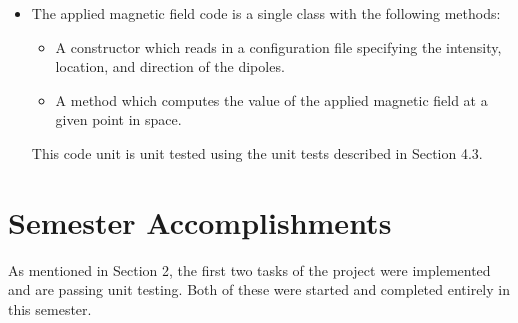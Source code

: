 \documentclass[11pt,fullpage]{article}
\theoremstyle{lemma}
\theoremstyle{definition}
\theoremstyle{lemma}
\begin{document}
\begin{itemize}
	\item The applied magnetic field code is a single class with the following methods:
	\begin{itemize}
		\item A constructor which reads in a configuration file specifying the intensity, location, and direction of the dipoles.
		\item A method which computes the value of the applied magnetic field at a given point in space.
	\end{itemize}
	This code unit is unit tested using the unit tests described in Section 4.3.
\end{itemize}

\section{Semester Accomplishments}
As mentioned in Section 2, the first two tasks of the project were implemented and are passing unit testing. Both of these were started and completed entirely in this semester.



\end{document}
